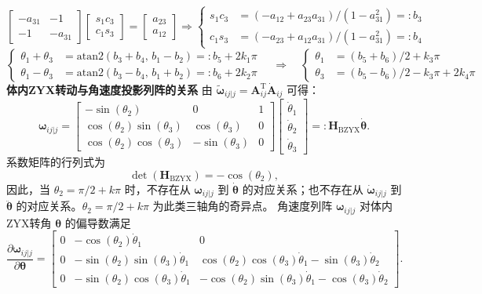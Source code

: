 \[
\begin{bmatrix}
-a_{31} & -1\\
-1 & -a_{31}
\end{bmatrix}
\begin{bmatrix}
s_1c_3\\
c_1s_3
\end{bmatrix}
=
\begin{bmatrix}
a_{23}\\
a_{12}
\end{bmatrix}
\Rightarrow
\left\{\begin{aligned}
s_1c_3 &= (-a_{12}+a_{23}a_{31})/(1-a_{31}^2)=:b_3\\
c_1s_3 &= (-a_{23}+a_{12}a_{31})/(1-a_{31}^2)=:b_4
\end{aligned}\right.
\]
\[
\left\{\begin{aligned}
\theta_1+\theta_3 &= \mathrm{atan2}(b_3+b_4,\,b_1-b_2)=:b_5+2k_1\pi\\
\theta_1-\theta_3 &= \mathrm{atan2}(b_3-b_4,\,b_1+b_2)=:b_6+2k_2\pi
\end{aligned}\right.
\quad\Rightarrow\quad
\left\{\begin{aligned}
\theta_1 &= (b_5+b_6)/2+k_3\pi\\
\theta_3 &= (b_5-b_6)/2-k_3\pi+2k_4\pi
\end{aligned}\right.
\]
\textbf{体内ZYX转动与角速度投影列阵的关系} 由 $\tilde{\boldsymbol{\omega}}_{ij|j}=\boldsymbol{A}_{ij}^{\mathrm{T}}\dot{\boldsymbol{A}}_{ij}$ 可得：
\[
\boldsymbol{\omega}_{ij|j}=
\begin{bmatrix}
-\sin(\theta_2) & 0 & 1\\
\cos(\theta_2)\sin(\theta_3) & \cos(\theta_3) & 0\\
\cos(\theta_2)\cos(\theta_3) & -\sin(\theta_3) & 0
\end{bmatrix}
\begin{bmatrix}
\dot{\theta}_1\\
\dot{\theta}_2\\
\dot{\theta}_3
\end{bmatrix}
=:\boldsymbol{H}_{\mathrm{BZYX}}\dot{\boldsymbol{\theta}}.
\]
系数矩阵的行列式为
\[
\det(\boldsymbol{H}_{\mathrm{BZYX}})=-\cos(\theta_2),
\]
因此，当 $\theta_2=\pi/2+k\pi$ 时，不存在从 $\boldsymbol{\omega}_{ij|j}$ 到 $\dot{\boldsymbol{\theta}}$ 的对应关系；也不存在从 $\dot{\boldsymbol{\omega}}_{ij|j}$ 到 $\ddot{\boldsymbol{\theta}}$ 的对应关系。$\theta_2=\pi/2+k\pi$ 为此类三轴角的奇异点。
角速度列阵 $\boldsymbol{\omega}_{ij|j}$ 对体内ZYX转角 $\boldsymbol{\theta}$ 的偏导数满足
\[
\frac{\partial\boldsymbol{\omega}_{ij|j}}{\partial\boldsymbol{\theta}}=
\begin{bmatrix}
0 & -\cos(\theta_2)\dot{\theta}_1 & 0\\
0 & -\sin(\theta_2)\sin(\theta_3)\dot{\theta}_1 & \cos(\theta_2)\cos(\theta_3)\dot{\theta}_1-\sin(\theta_3)\dot{\theta}_2\\
0 & -\sin(\theta_2)\cos(\theta_3)\dot{\theta}_1 & -\cos(\theta_2)\sin(\theta_3)\dot{\theta}_1-\cos(\theta_3)\dot{\theta}_2
\end{bmatrix}.
\]

